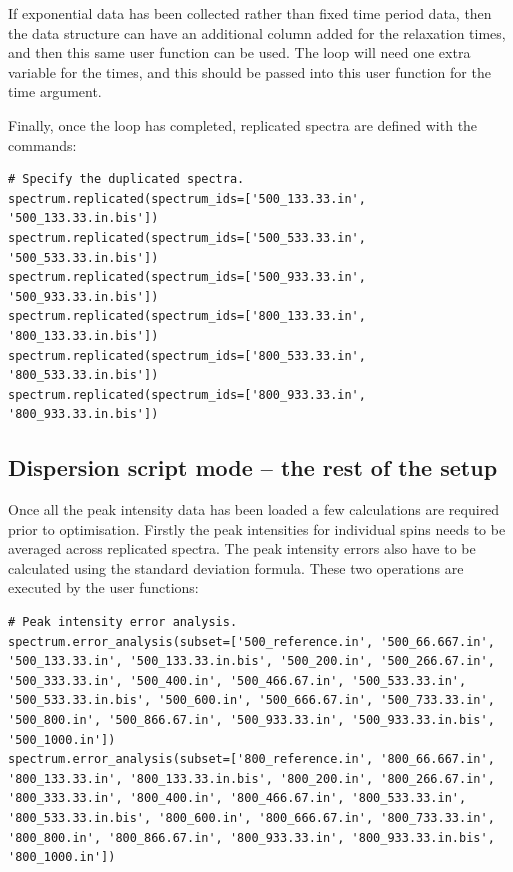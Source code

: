 If exponential data has been collected rather than fixed time period data, then the  data structure can have an additional column added for the relaxation times, and then this same user function can be used.  The  loop will need one extra variable for the times, and this should be passed into this  user function for the time argument.

Finally, once the  loop has completed, replicated spectra are defined with the commands:

\begin{lstlisting}[firstnumber=111]
# Specify the duplicated spectra.
spectrum.replicated(spectrum_ids=['500_133.33.in', '500_133.33.in.bis'])
spectrum.replicated(spectrum_ids=['500_533.33.in', '500_533.33.in.bis'])
spectrum.replicated(spectrum_ids=['500_933.33.in', '500_933.33.in.bis'])
spectrum.replicated(spectrum_ids=['800_133.33.in', '800_133.33.in.bis'])
spectrum.replicated(spectrum_ids=['800_533.33.in', '800_533.33.in.bis'])
spectrum.replicated(spectrum_ids=['800_933.33.in', '800_933.33.in.bis'])
\end{lstlisting}



\subsection{Dispersion script mode -- the rest of the setup} \label{sect: dispersion setup fin}

Once all the peak intensity data has been loaded a few calculations are required prior to optimisation.  Firstly the peak intensities for individual spins needs to be averaged across replicated spectra.  The peak intensity errors also have to be calculated using the standard deviation formula.  These two operations are executed by the user functions:

\begin{lstlisting}[firstnumber=119]
# Peak intensity error analysis.
spectrum.error_analysis(subset=['500_reference.in', '500_66.667.in', '500_133.33.in', '500_133.33.in.bis', '500_200.in', '500_266.67.in', '500_333.33.in', '500_400.in', '500_466.67.in', '500_533.33.in', '500_533.33.in.bis', '500_600.in', '500_666.67.in', '500_733.33.in', '500_800.in', '500_866.67.in', '500_933.33.in', '500_933.33.in.bis', '500_1000.in'])
spectrum.error_analysis(subset=['800_reference.in', '800_66.667.in', '800_133.33.in', '800_133.33.in.bis', '800_200.in', '800_266.67.in', '800_333.33.in', '800_400.in', '800_466.67.in', '800_533.33.in', '800_533.33.in.bis', '800_600.in', '800_666.67.in', '800_733.33.in', '800_800.in', '800_866.67.in', '800_933.33.in', '800_933.33.in.bis', '800_1000.in'])
\end{lstlisting}

